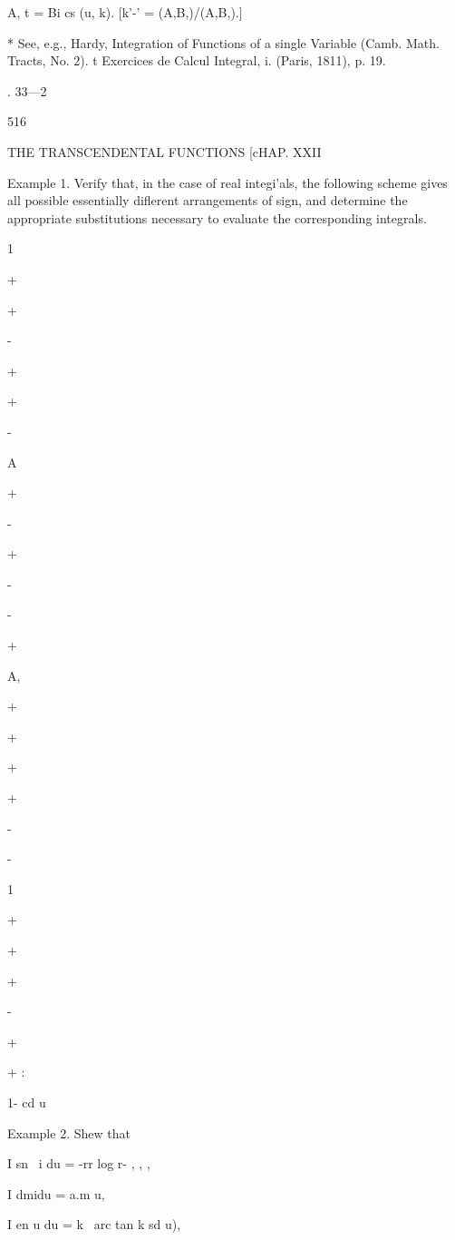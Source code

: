 A, t = Bi cs (u, k). [k'-' = (A,B,)/(A,B,).]

* See, e.g., Hardy, Integration of Functions of a single Variable
(Camb. Math. Tracts, No. 2). t Exercices de Calcul Integral, i.
(Paris, 1811), p. 19.

. 33—2



516



THE TRANSCENDENTAL FUNCTIONS [cHAP. XXII



Example 1. Verify that, in the case of real integi'als, the following
scheme gives all possible essentially diflerent arrangements of sign,
and determine the appropriate substitutions necessary to evaluate the
corresponding integrals.



 1


+


+


-


+


+


-


A


+


-


+


-


-


+


A,


+


+


+


+


-


-


1


+


+


+


-


+


+ :



1- cd u



Example 2. Shew that

I sn \ i du = -rr log r- , , ,

I dmidu = a.m u,



I en u du = k~ arc tan k sd u),



